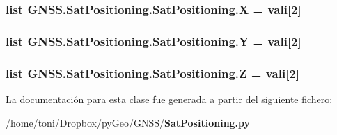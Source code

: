 \subsubsection[{X}]{\setlength{\rightskip}{0pt plus 5cm}list G\-N\-S\-S.\-Sat\-Positioning.\-Sat\-Positioning.\-X = {\bf vali}[2]\hspace{0.3cm}{\ttfamily [static]}}\label{classGNSS_1_1SatPositioning_1_1SatPositioning_a56a835fdc3cfdf5c092cde9b10792d73}
\subsubsection[{Y}]{\setlength{\rightskip}{0pt plus 5cm}list G\-N\-S\-S.\-Sat\-Positioning.\-Sat\-Positioning.\-Y = {\bf vali}[2]\hspace{0.3cm}{\ttfamily [static]}}\label{classGNSS_1_1SatPositioning_1_1SatPositioning_a40278bc6aa56c03fda110afe8165c507}
\subsubsection[{Z}]{\setlength{\rightskip}{0pt plus 5cm}list G\-N\-S\-S.\-Sat\-Positioning.\-Sat\-Positioning.\-Z = {\bf vali}[2]\hspace{0.3cm}{\ttfamily [static]}}\label{classGNSS_1_1SatPositioning_1_1SatPositioning_a5afe04025a56065826847bdb2a98edea}


La documentación para esta clase fue generada a partir del siguiente fichero\-:\begin{DoxyCompactItemize}
\item 
/home/toni/\-Dropbox/py\-Geo/\-G\-N\-S\-S/{\bf Sat\-Positioning.\-py}\end{DoxyCompactItemize}
